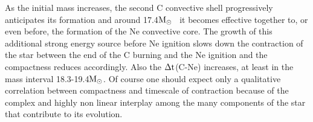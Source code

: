 \documentclass{aastex631}
\newcommand{\msun}{$\rm M_\odot$}
\begin{document}
As the initial mass increases, the second C convective shell progressively anticipates its formation and around 17.4\msun~ it becomes effective together to, or even before, the formation of the Ne convective core. The growth of this additional strong energy source before Ne ignition slows down the contraction of the star between the end of the C burning and the Ne ignition and the compactness reduces accordingly. Also the $\rm \Delta t$(C-Ne) increases, at least in the mass interval 18.3-19.4\msun. Of course one should expect only a qualitative correlation between compactness and timescale of contraction because of the complex and highly non linear interplay among the many components of the star that contribute to its evolution.

\begin{figure}[ht!]
\caption{\label{fig:vacsi}}
\end{figure}
\end{document}
